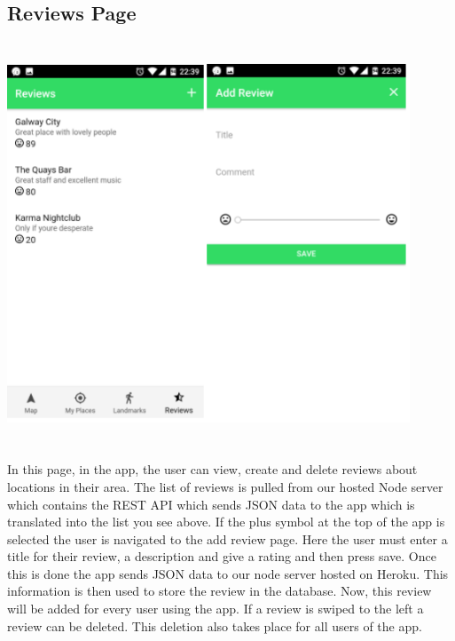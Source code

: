 \subsection{Reviews Page}
\begin{center}    
	\includegraphics[width=12cm, height=12cm]{img/reviews.png}
\end{center}
In this page, in the app, the user can view, create and delete reviews about locations in their area. The list of reviews is pulled from our hosted Node server which contains the REST API which sends JSON data to the app which is translated into the list you see above. If the plus symbol at the top of the app is selected the user is navigated to the add review page. Here the user must enter a title for their review, a description and give a rating and then press save. Once this is done the app sends JSON data to our node server hosted on Heroku. This information is then used to store the review in the database. Now, this review will be added for every user using the app. If a review is swiped to the left a review can be deleted. This deletion also takes place for all users of the app.

